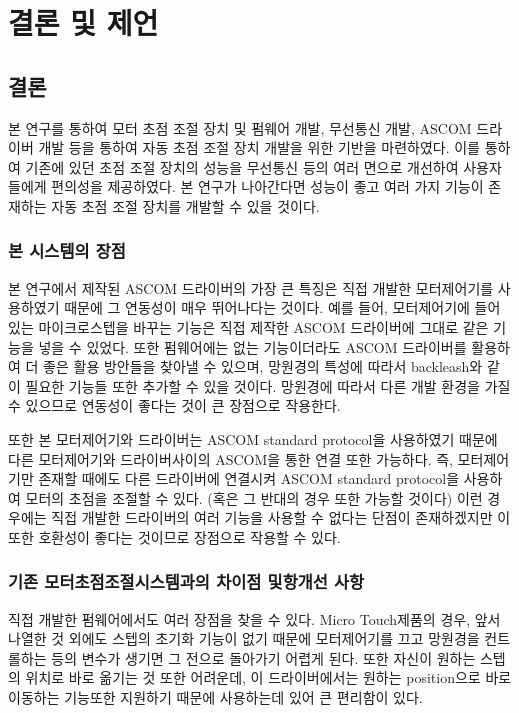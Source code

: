 \section{결론 및 제언}
	
\subsection{결론}

본 연구를 통하여 모터 초점 조절 장치 및 펌웨어 개발, 무선통신 개발, ASCOM 드라이버 개발 등을 통하여 자동 초점 조절 장치 개발을 위한 기반을 마련하였다. 이를 통하여 기존에 있던 초점 조절 장치의 성능을 무선통신 등의 여러 면으로 개선하여 사용자들에게 편의성을 제공하였다. 본 연구가 나아간다면 성능이 좋고 여러 가지 기능이 존재하는 자동 초점 조절 장치를 개발할 수 있을 것이다.

\subsubsection{본 시스템의 장점}
본 연구에서 제작된 ASCOM 드라이버의 가장 큰 특징은 직접 개발한 모터제어기를 사용하였기 때문에 그 연동성이 매우 뛰어나다는 것이다. 예를 들어, 모터제어기에 들어있는 마이크로스텝을 바꾸는 기능은 직접 제작한 ASCOM 드라이버에 그대로 같은 기능을 넣을 수 있었다. 또한 펌웨어에는 없는 기능이더라도 ASCOM 드라이버를 활용하여 더 좋은 활용 방안들을 찾아낼 수 있으며, 망원경의 특성에 따라서 backleash와 같이 필요한 기능들 또한 추가할 수 있을 것이다.  망원경에 따라서 다른 개발 환경을 가질 수 있으므로 연동성이 좋다는 것이 큰 장점으로 작용한다.

또한 본 모터제어기와 드라이버는 ASCOM standard protocol을 사용하였기 때문에 다른 모터제어기와 드라이버사이의 ASCOM을 통한 연결 또한 가능하다. 즉, 모터제어기만 존재할 때에도 다른 드라이버에 연결시켜 ASCOM standard protocol을 사용하여 모터의 초점을 조절할 수 있다. (혹은 그 반대의 경우 또한 가능할 것이다) 이런 경우에는 직접 개발한 드라이버의 여러 기능을 사용할 수 없다는 단점이 존재하겠지만 이 또한 호환성이 좋다는 것이므로 장점으로 작용할 수 있다.

\subsubsection{기존 모터초점조절시스템과의 차이점 및항개선 사항}
직접 개발한 펌웨어에서도 여러 장점을 찾을 수 있다. Micro Touch제품의 경우, 앞서 나열한 것 외에도 스텝의 초기화 기능이 없기 때문에 모터제어기를 끄고 망원경을 컨트롤하는 등의 변수가 생기면 그 전으로 돌아가기 어렵게 된다. 또한 자신이 원하는 스텝의 위치로 바로 옮기는 것 또한 어려운데, 이 드라이버에서는 원하는 position으로 바로 이동하는 기능또한 지원하기 때문에 사용하는데 있어 큰 편리함이 있다. 

